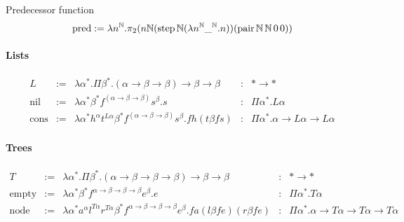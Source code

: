 Predecessor function
$$
\text{pred} :=
\lambda n^{\mathbb{N}}.
\pi_2 (
  n
  \mathbb{N} (\text{step}\,\mathbb{N} (\lambda n^{\mathbb{N}} \_^{\mathbb{N}}. n))
  (\text{pair}\,\mathbb{N}\,\mathbb{N}\,0\,0)
)
$$



\paragraph{Lists}

$$
\begin{array}{lllll}
  L
  &:=& \lambda \alpha^* .
       \Pi \beta^* . (\alpha\to\beta\to\beta) \to \beta \to \beta
  &:& * \to *
  \\
  \text{nil}
  &:=& \lambda \alpha^* \beta^* f^{(\alpha\to\beta\to\beta)} s^\beta . s
  &:& \Pi \alpha^* . L \alpha
  \\
  \text{cons}
  &:=& \lambda
       \alpha^*
       h^\alpha
       t^{L\alpha}
       \beta^*
       f^{(\alpha\to\beta\to\beta)}
       s^\beta
       . f h (t \beta f s)
  &:& \Pi \alpha^* . \alpha \to L \alpha \to L \alpha
\end{array}
$$




\paragraph{Trees}

$$
\begin{array}{lllll}
  T
  &:=& \lambda \alpha^* .
       \Pi \beta^* . (\alpha\to\beta\to\beta\to\beta) \to \beta \to \beta
  &:& * \to *
  \\
  \text{empty}
  &:=& \lambda \alpha^* \beta^* f^{\alpha\to\beta\to\beta\to\beta} e^\beta . e
  &:& \Pi \alpha^* . T \alpha
  \\
  \text{node}
  &:=& \lambda
       \alpha^*
       a^\alpha
       l^{T\alpha}
       r^{T\alpha}
       \beta^*
       f^{\alpha\to\beta\to\beta\to\beta}
       e^\beta
       . f a (l \beta f e) (r \beta f e)
  &:& \Pi \alpha^* . \alpha \to T \alpha \to T \alpha \to T \alpha
\end{array}
$$

